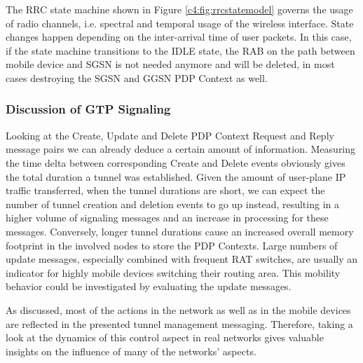 The \ac{RRC} state machine shown in Figure \ref{c4:fig:rrcstatemodel} governs the usage of radio channels, i.e. spectral and temporal usage of the wireless interface. State changes happen depending on the inter-arrival time of user packets. In this case, if the state machine transitions to the IDLE state, the \ac{RAB} on the path between mobile device and \ac{SGSN} is not needed anymore and will be deleted, in most cases destroying the SGSN and GGSN PDP Context as well.




\subsubsection{Discussion of GTP Signaling}

Looking at the Create, Update and Delete PDP Context Request and Reply message pairs we can already deduce a certain amount of information. Measuring the time delta between corresponding Create and Delete events obviously gives the total duration a tunnel was established. Given the amount of user-plane IP traffic transferred, when the tunnel durations are short, we can expect the number of tunnel creation and deletion events to go up instead, resulting in a higher volume of signaling messages and an increase in processing for these messages. Conversely, longer tunnel durations cause an increased overall memory footprint in the involved nodes to store the \ac{PDP} Contexts. Large numbers of update messages, especially combined with frequent \ac{RAT} switches, are usually an indicator for highly mobile devices switching their routing area. This mobility behavior could be investigated by evaluating the update messages.

As discussed, most of the actions in the network as well as in the mobile devices are reflected in the presented tunnel management messaging. Therefore, taking a look at the dynamics of this control aspect in real networks gives valuable insights on the influence of many of the networks' aspects.




